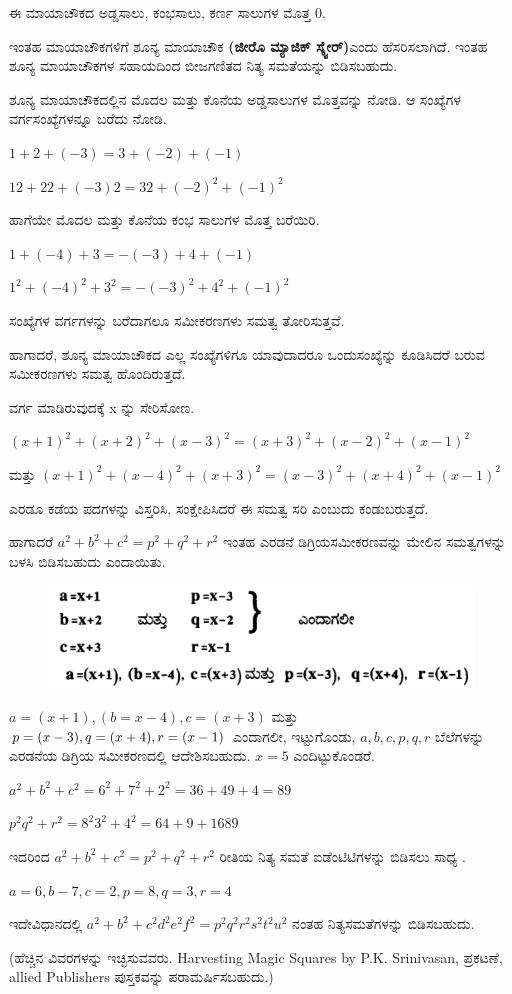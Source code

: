 ಈ ಮಾಯಾಚೌಕದ ಅಡ್ಡಸಾಲು, ಕಂಭಸಾಲು, ಕರ್ಣ ಸಾಲುಗಳ ಮೊತ್ತ 0.

ಇಂತಹ ಮಾಯಾಚೌಕಗಳಿಗೆ ಶೂನ್ಯ ಮಾಯಾಚೌಕ \textbf{(ಜೀರೊ ಮ್ಯಾಜಿಕ್ ಸ್ಕ್ವೇರ್)}\break ಎಂದು ಹೆಸರಿಸಲಾಗಿದೆ. ಇಂತಹ ಶೂನ್ಯ ಮಾಯಾಚೌಕಗಳ ಸಹಾಯದಿಂದ ಬೀಜಗಣಿತದ ನಿತ್ಯ ಸಮತೆಯನ್ನು ಬಿಡಿಸಬಹುದು.

ಶೂನ್ಯ ಮಾಯಾಚೌಕದಲ್ಲಿನ ಮೊದಲ ಮತ್ತು ಕೊನೆಯ ಅಡ್ಡಸಾಲುಗಳ ಮೊತ್ತವನ್ನು ನೋಡಿ. ಆ ಸಂಖ್ಯೆಗಳ ವರ್ಗಸಂಖ್ಯೆಗಳನ್ನೂ ಬರೆದು ನೋಡಿ.

$1+2+(-3) =3+(-2)+(-1)$

$12+22+(-3) 2 =32+(-2)^2 +(-1)^2$

ಹಾಗೆಯೇ ಮೊದಲ ಮತ್ತು ಕೊನೆಯ ಕಂಭ ಸಾಲುಗಳ ಮೊತ್ತ ಬರೆಯಿರಿ.

$1+(-4)+3 = -(-3)+4+(-1)$

$1^2+(-4)^2 +3^2 =-(-3)^2+4^2 +(-1)^2$

ಸಂಖ್ಯೆಗಳ ವರ್ಗಗಳನ್ನು ಬರೆದಾಗಲೂ ಸಮೀಕರಣಗಳು ಸಮತ್ವ ತೋರಿಸುತ್ತವೆ.

ಹಾಗಾದರೆ, ಶೂನ್ಯ ಮಾಯಾಚೌಕದ ಎಲ್ಲ ಸಂಖ್ಯೆಗಳಿಗೂ ಯಾವುದಾದರೂ ಒಂದು\break ಸಂಖ್ಯೆನ್ನು ಕೂಡಿಸಿದರೆ ಬರುವ ಸಮೀಕರಣಗಳು ಸಮತ್ವ ಹೊಂದಿರುತ್ತದೆ.

ವರ್ಗ ಮಾಡಿರುವುದಕ್ಕೆ x ನ್ನು ಸೇರಿಸೋಣ.

$(x+1)^2+(x+2)^2+(x-3)^2 = (x+3)^2+(x-2)^2+(x-1)^2$

ಮತ್ತು $(x+1)^2+(x-4)^2+(x+3)^2 = (x-3)^2+(x+4)^2+(x-1)^2$

ಎರಡೂ ಕಡೆಯ ಪದಗಳನ್ನು ವಿಸ್ತರಿಸಿ, ಸಂಕ್ಷೇಪಿಸಿದರೆ ಈ ಸಮತ್ವ ಸರಿ ಎಂಬುದು ಕಂಡುಬರುತ್ತದೆ.

ಹಾಗಾದರೆ $a^2+b^2+c^2 = p^2+q^2+r^2$ ಇಂತಹ ಎರಡನೆ ಡಿಗ್ರಿಯ\break ಸಮೀಕರಣವನ್ನು ಮೇಲಿನ ಸಮತ್ವಗಳನ್ನು ಬಳಸಿ ಬಿಡಿಸಬಹುದು ಎಂದಾಯಿತು.
\begin{figure}[H]
\includegraphics[scale=.9]{src/figures/chap10/fig10.3.jpg}
\end{figure}

$a=(x+1), (b=x-4), c=(x+3)$ ಮತ್ತು $p=(x-3),\break q=(x+4), r=(x-1)$ ಎಂದಾಗಲೀ, ಇಟ್ಟುಗೊಂಡು, $a, b, c, p, q, r$ ಬೆಲೆ\-ಗಳನ್ನು ಎರಡನೆಯ ಡಿಗ್ರಿಯ ಸಮೀಕರಣದಲ್ಲಿ ಆದೇಶಿಸಬಹುದು. $x=5$ ಎಂದಿಟ್ಟು\-ಕೊಂಡರೆ.

\newpage

$a^2 +b^2+c^2= 6^2 + 7^2 + 2^2 = 36 +49 +4=89$

\vskip 2pt

$p^2 q^2 + r^2 = 8^2 3^2 +4^2 = 64 +9 + 16 89$

\vskip 2pt

ಇದರಿಂದ $a^2+b^2+c^2 = p^2+q^2+r^2$ ರೀತಿಯ ನಿತ್ಯ ಸಮತೆ ಐಡೆಂಟಿಟಿಗಳನ್ನು ಬಿಡಿಸಲು ಸಾಧ್ಯ .

\vskip 2pt

$a=6, b-7, c=2, p=8, q=3, r=4$

\vskip 2pt

ಇದೇವಿಧಾನದಲ್ಲಿ $a^2 +b^2 +c^2 d^2 e^2 f^2 = p^2 q^2 r^2 s^2 t^2 u^2$ ನಂತಹ ನಿತ್ಯ\-ಸಮತೆಗಳನ್ನು ಬಿಡಿಸಬಹುದು.

\vskip 2pt

(ಹೆಚ್ಚಿನ ವಿವರಗಳನ್ನು ಇಚ್ಛಿಸುವವರು. Harvesting Magic Squares by P.K. Srinivasan, ಪ್ರಕಟಣೆ, allied Publishers ಪುಸ್ತಕವನ್ನು ಪರಾಮರ್ಷಿಸಬಹುದು.)
